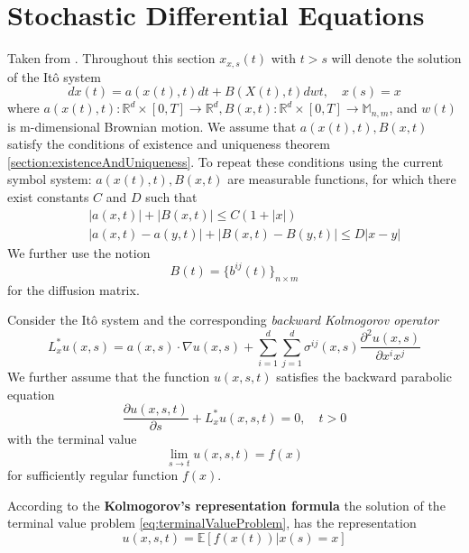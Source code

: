 \documentclass[12pt]{book}
\begin{document}
\section{Stochastic Differential Equations}\label{section:stochasticDifferentialEquations}
Taken from \cite{schuss2009theory}. Throughout this section $x_{x,s}(t)$ with $t>s$ will denote the solution of the It\^{o} system 
\begin{equation}\label{Eq:ItoSystem}
dx(t)= a(x(t),t)dt+B(X(t),t)dwt,\quad x(s)=x
\end{equation}
where $a(x(t),t):\mathbb{R}^d\times [0,T] \rightarrow \mathbb{R}^d, B(x,t):\mathbb{R}^d\times[0,T]\rightarrow\mathbb{M}_{n,m}$, and $w(t)$ is m-dimensional Brownian motion. 
We assume that $a(x(t),t), B(x,t)$ satisfy the conditions of existence and uniqueness theorem \ref{section:existenceAndUniqueness}. To repeat these conditions using the current symbol system:
$a(x(t),t), B(x,t)$ are measurable functions, for which there exist constants $C$ and $D$ such that 
\begin{eqnarray*}
	& &|a(x,t)|+|B(x,t)|\leq C(1+|x|)\\
	& &|a(x,t)-a(y,t)|+|B(x,t)-B(y,t)|\leq D|x-y|
\end{eqnarray*}
We further use the notion
\begin{equation*}
B(t) = \{b^{ij}(t)\}_{n\times m}
\end{equation*}
for the diffusion matrix.

Consider the It\^o system and the corresponding \textit{backward Kolmogorov operator}
\begin{equation}\label{eq:backwardKolmogorovOperator}
L^*_xu(x,s)=a(x,s)\cdot \nabla u(x,s)+\sum_{i=1}^d\sum_{j=1}^d \sigma^{ij}(x,s)\frac{\partial^2u(x,s)}{\partial x^ix^j}
\end{equation} 
We further assume that the function $u(x,s,t)$ satisfies the backward parabolic equation 
\begin{equation}\label{eq:terminalValueProblem}
\frac{\partial u(x,s,t)}{\partial s}+L^*_x u(x,s,t)=0,\quad t>0
\end{equation}
with the terminal value 
\begin{equation*}
\lim_{s\rightarrow t} u(x,s,t)=f(x)
\end{equation*}
for sufficiently regular function $f(x)$. 

According to the \textbf{Kolmogorov's representation formula} the solution of the terminal value problem \ref{eq:terminalValueProblem}, has the representation 
\begin{equation*}
u(x,s,t)=\mathbb{E}[f(x(t))|x(s)=x]
\end{equation*}
\end{document}
